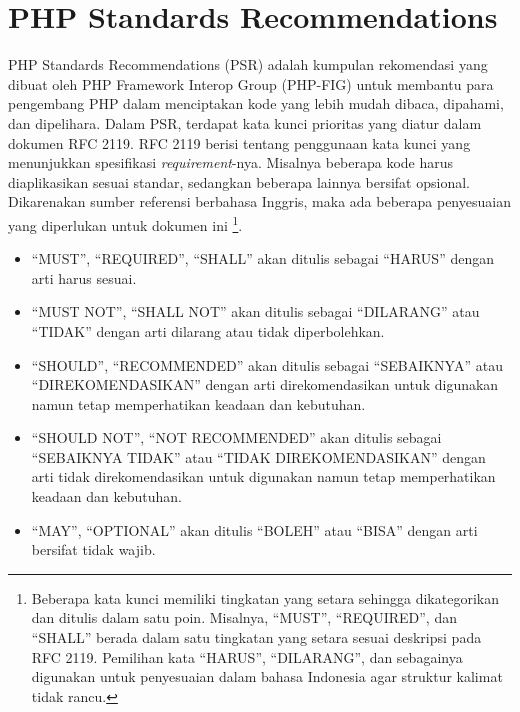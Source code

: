 \section{PHP Standards Recommendations}
\label{sec:psr}

PHP Standards Recommendations (PSR) adalah kumpulan rekomendasi yang dibuat oleh PHP Framework Interop Group (PHP-FIG) untuk membantu para pengembang PHP dalam menciptakan kode yang lebih mudah dibaca, dipahami, dan dipelihara. 
Dalam PSR, terdapat kata kunci prioritas yang diatur dalam dokumen RFC 2119. RFC 2119 \cite{RFC2119} berisi tentang penggunaan kata kunci yang menunjukkan spesifikasi \textit{requirement}-nya. Misalnya beberapa kode harus diaplikasikan sesuai standar, sedangkan beberapa lainnya bersifat opsional. 
Dikarenakan sumber referensi berbahasa Inggris, maka ada beberapa penyesuaian yang diperlukan untuk dokumen ini \footnote{Beberapa kata kunci memiliki tingkatan yang setara sehingga dikategorikan dan ditulis dalam satu poin. Misalnya, ``MUST'', ``REQUIRED'', dan ``SHALL'' berada dalam satu tingkatan yang setara sesuai deskripsi pada RFC 2119. Pemilihan kata ``HARUS'', ``DILARANG'', dan sebagainya digunakan untuk penyesuaian dalam bahasa Indonesia agar struktur kalimat tidak rancu.}.

\begin{itemize}
	\item ``MUST'', ``REQUIRED'', ``SHALL'' akan ditulis sebagai ``HARUS'' dengan arti harus sesuai.
	\item ``MUST NOT'', ``SHALL NOT'' akan ditulis sebagai ``DILARANG'' atau ``TIDAK'' dengan arti dilarang atau tidak diperbolehkan.
	\item ``SHOULD'', ``RECOMMENDED'' akan ditulis sebagai ``SEBAIKNYA'' atau ``DIREKOMENDASIKAN'' dengan arti direkomendasikan untuk digunakan namun tetap memperhatikan keadaan dan kebutuhan.
	\item ``SHOULD NOT'', ``NOT RECOMMENDED'' akan ditulis sebagai ``SEBAIKNYA TIDAK'' atau ``TIDAK DIREKOMENDASIKAN'' dengan arti tidak direkomendasikan untuk digunakan namun tetap memperhatikan keadaan dan kebutuhan.
	\item ``MAY'', ``OPTIONAL'' akan ditulis ``BOLEH'' atau ``BISA'' dengan arti bersifat tidak wajib.
\end{itemize}


